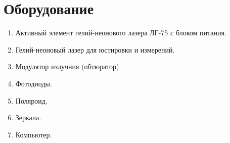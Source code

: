 \section*{Оборудование}

\begin{enumerate}
	\item Активный элемент гелий-неонового лазера ЛГ-75 с блоком питания.

	\item Гелий-неоновый лазер для юстировки и измерений.

	\item Модулятор излучния (обтюратор).

	\item Фотодиоды.

	\item Поляроид.

	\item Зеркала.

	\item Компьютер.
\end{enumerate}